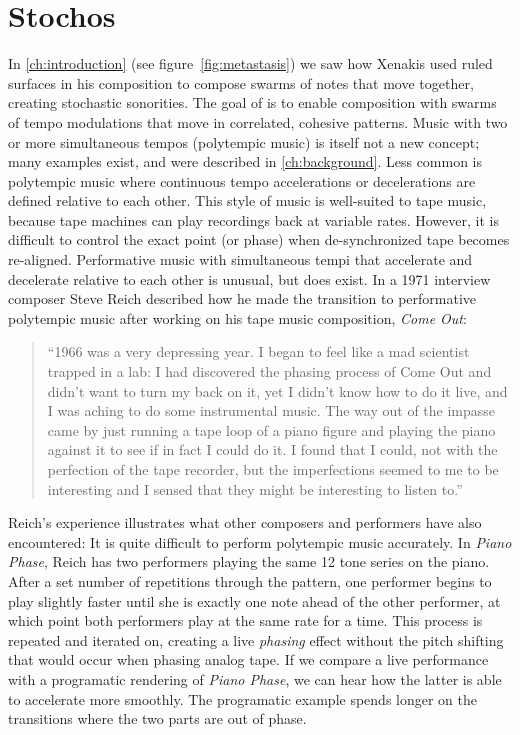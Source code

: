 \section{Stochos}
\label{sec:polytempic-stochos}
In \autoref{ch:introduction} (see figure~\ref{fig:metastasis}) we saw
how Xenakis used ruled surfaces in his composition to compose swarms
of notes that move together, creating stochastic sonorities. The goal
of \polytempic is to enable composition with swarms of tempo
modulations that move in correlated, cohesive patterns. Music with two
or more simultaneous tempos (polytempic music) is itself not a new
concept; many examples exist,\cite{Greschak2003} and were
described in \autoref{ch:background}. Less common is polytempic music
where continuous tempo accelerations or decelerations are defined
relative to each other. This style of music is well-suited to tape
music, because tape machines can play recordings back at variable
rates. However, it is difficult to control the exact point (or phase)
when de-synchronized tape becomes re-aligned. Performative music with
simultaneous tempi that accelerate and decelerate relative to each
other is unusual, but does exist. In a 1971 interview composer Steve
Reich described how he made the transition to performative polytempic
music after working on his tape music composition, \textit{Come Out}:
\begin{quotation}
  ``1966 was a very depressing year. I began to feel like a mad
  scientist trapped in a lab: I had discovered the phasing process
  of Come Out and didn't want to turn my back on it, yet I didn't know
  how to do it live, and I was aching to do some instrumental
  music. The way out of the impasse came by just running a tape loop
  of a piano figure and playing the piano against it to see if in fact
  I could do it. I found that I could, not with the perfection of the
  tape recorder, but the imperfections seemed to me to be interesting
  and I sensed that they might be interesting to listen to.''\cite{Nyman2015}
\end{quotation}
Reich's experience illustrates what other composers and performers
have also encountered: It is quite difficult to perform polytempic
music accurately. In \textit{Piano Phase}, Reich has two performers
playing the same 12 tone series on the piano. After a set number of
repetitions through the pattern, one performer begins to play slightly
faster until she is exactly one note ahead of the other performer, at
which point both performers play at the same rate for a time. This
process is repeated and iterated on, creating a live \emph{phasing}
effect without the pitch shifting that would occur when phasing analog
tape. If we compare a live performance\cite{Huisman1989} with a
programatic rendering\cite{Chen2014} of \textit{Piano Phase}, we can
hear how the latter is able to accelerate more smoothly. The
programatic example spends longer on the transitions where the two
parts are out of phase.

